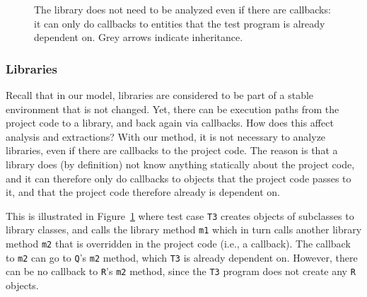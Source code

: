 {\begin{figure}
\begin{adjustbox}{max width=\linewidth}
\end{adjustbox}
  \caption{The library does not need to be analyzed even if there are callbacks: it can only do
  callbacks to entities that the test program is already dependent on. Grey arrows indicate inheritance.}
  \label{libraryexample}
\end{figure}

\subsubsection*{Libraries}

Recall that in our model, libraries are considered to be part of a stable environment that is not
changed. Yet, there can be execution paths from the project code to a library, and back
again via callbacks. How does this affect analysis and extractions? With our method, it is not
necessary to analyze libraries, even if there are callbacks to the project code. The reason is that a
library does (by definition) not know anything statically about the project code, and it can therefore only
do callbacks to objects that the project code passes to it, and that the project code therefore already is dependent on.

This is illustrated in Figure~\ref{libraryexample} where test case \texttt{T3} creates objects of
subclasses to library classes, and calls the library method \texttt{m1} which in turn  calls
another library method \texttt{m2} that is overridden in the project code (i.e., a callback). The
callback to \texttt{m2} can go to \texttt{Q}'s \texttt{m2} method, which \texttt{T3} is already dependent on. However, there can be no callback to \texttt{R}'s \texttt{m2} method, since the \texttt{T3} program does not create any \texttt{R} objects.

}
